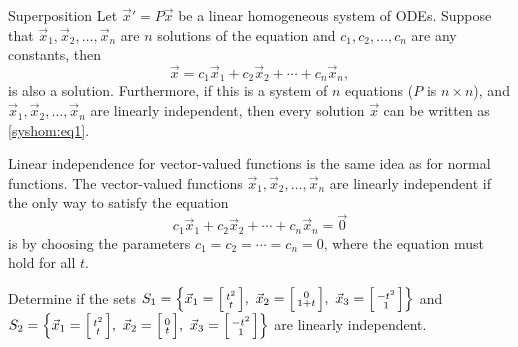 \begin{theorem1}{Superposition}
Let
${\vec{x}}' = P\vec{x}$ be a linear homogeneous system of ODEs.  Suppose
that $\vec{x}_1,\vec{x}_2,\ldots,\vec{x}_n$ are $n$ solutions of the equation
and $c_1,c_2,\ldots,c_n$ are any constants, then
\begin{equation} \label{syshom:eq1}
\vec{x} = c_1 \vec{x}_1 + c_2 \vec{x}_2 + \cdots + c_n \vec{x}_n ,
\end{equation}
is also a solution.
Furthermore, if this is a system of $n$ equations ($P$ is $n\times n$), and
$\vec{x}_1,\vec{x}_2,\ldots,\vec{x}_n$ are linearly independent, then every
solution  $\vec{x}$ can be written as \eqref{syshom:eq1}.
\end{theorem1}

Linear independence for vector-valued functions is the same idea as
for normal functions.
The vector-valued functions
$\vec{x}_1,\vec{x}_2,\ldots,\vec{x}_n$ are
linearly independent
if the only way to satisfy the equation
\begin{equation*}
c_1 \vec{x}_1 + c_2 \vec{x}_2 + \cdots + c_n \vec{x}_n  = \vec{0}
\end{equation*}
is by choosing the parameters $c_1 = c_2 = \cdots = c_n = 0$, where the equation
must hold for all $t$.

\begin{example} Determine if the sets $S_1 = \Bigl\{ \vec{x}_1 = \Bigl[ \begin{smallmatrix} t^2 \\ t \end{smallmatrix} \Bigr],\ \vec{x}_2 = \Bigl[ \begin{smallmatrix} 0 \\ 1+t \end{smallmatrix} \Bigr],\ \vec{x}_3 = \Bigl[ \begin{smallmatrix} -t^2 \\ 1 \end{smallmatrix} \Bigr] \Bigr\}$ and $S_2 = \Bigl\{ \vec{x}_1 = \Bigl[ \begin{smallmatrix} t^2 \\ t \end{smallmatrix} \Bigr],\ \vec{x}_2 = \Bigl[ \begin{smallmatrix} 0 \\ t \end{smallmatrix} \Bigr],\ \vec{x}_3 = \Bigl[ \begin{smallmatrix} -t^2 \\ 1 \end{smallmatrix}
\Bigr]\Bigr\}$ are linearly independent.
\end{example}

